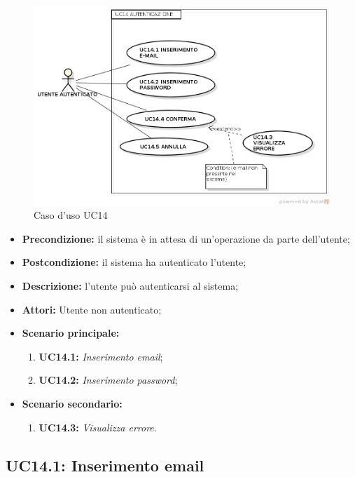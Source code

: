 \begin{figure}[h]
	\begin{center}
	\includegraphics[scale=0.4]{diagram/UC14.png}
	\caption{Caso d'uso UC14}
	\end{center}
\end{figure}
\begin{itemize}
	\item \textbf{Precondizione:} il sistema è in attesa di un'operazione da parte dell'utente;
	\item \textbf{Postcondizione:} il sistema ha autenticato l'utente;
	\item \textbf{Descrizione:} l'utente può autenticarsi al sistema;
	\item \textbf{Attori:} Utente non autenticato;
	\item \textbf{Scenario principale:}
	\begin{enumerate}
		\item \textbf{ UC14.1:} \textit{ Inserimento email};
		\item \textbf{ UC14.2:} \textit{ Inserimento password};
		
	\end{enumerate}
	\item \textbf{Scenario secondario:}
	\begin{enumerate}
		\item \textbf{ UC14.3:} \textit{ Visualizza errore}.
	\end{enumerate}
\end{itemize}
\subsection{ UC14.1: Inserimento email}


